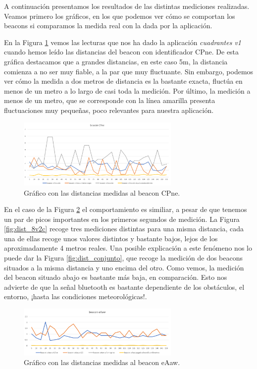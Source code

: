 A continuación presentamos los resultados de las distintas mediciones realizadas. Veamos primero los gráficos, en los que podemos ver cómo se comportan los beacons si comparamos la medida real con la dada por la aplicación. 

En la Figura \ref{fig:dist_CPne} vemos las lecturas que nos ha dado la aplicación \textit{cuadrantes v1} cuando hemos leído las distancias del beacon con identificador CPne. De esta gráfica destacamos que a grandes distancias, en este caso 5m, la distancia comienza a no ser muy fiable, a la par que muy fluctuante. Sin embargo, podemos ver cómo la medida a dos metros de distancia es la bastante exacta, fluctúa en menos de un metro a lo largo de casi toda la medición. Por último, la medición a menos de un metro, que se corresponde con la línea amarilla presenta fluctuaciones muy pequeñas, poco relevantes para nuestra aplicación. 

\begin{figure}[t]
	\centering
	\includegraphics[width=0.7\textwidth]{Imagenes/Descripciondeltrabajo/dist_CPne}
	\caption{Gráfico con las distancias medidas al beacon CPne. }
	\label{fig:dist_CPne}
\end{figure}

En el caso de la Figura \ref{fig:dist_eAaw} el comportamiento es similiar, a pesar de que tenemos un par de picos importantes en los primeros segundos de medición. La Figura \ref{fig:dist_8v2c} recoge tres mediciones distintas para una misma distancia, cada una de ellas recoge unos valores distintos y bastante bajos, lejos de los aproximadamente 4 metros reales. Una posible explicación a este fenómeno nos lo puede dar la Figura \ref{fig:dist_conjunto}, que recoge la medición de dos beacons situados a la misma distancia y uno encima del otro. Como vemos, la medición del beacon situado abajo es bastante más baja, en comparación. Esto nos advierte de que la señal bluetooth es bastante dependiente de los obstáculos, el entorno, ¡hasta las condiciones meteorológicas!. 


\begin{figure}[t]
	\centering
	\includegraphics[width=0.7\textwidth]{Imagenes/Descripciondeltrabajo/dist_eAaw}
	\caption{Gráfico con las distancias medidas al beacon eAaw. }
	\label{fig:dist_eAaw}
\end{figure}


